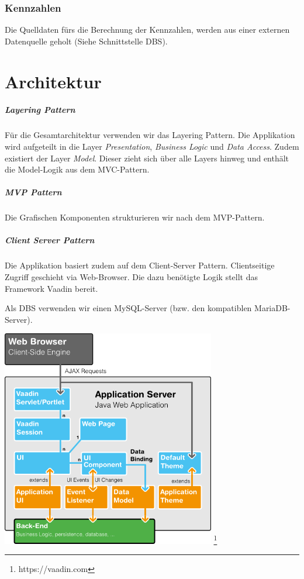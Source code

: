 \documentclass[a4paper]{scrreprt}
\begin{document}
\subsection{Kennzahlen}
Die Quelldaten fürs die Berechnung der Kennzahlen, werden aus einer externen Datenquelle geholt (Siehe Schnittstelle DBS).






\chapter{Architektur}
\paragraph{Layering Pattern}
Für die Gesamtarchitektur verwenden wir das Layering Pattern. Die Applikation wird aufgeteilt in die Layer \textit{Presentation}, \textit{Business Logic} und \textit{Data Access}. Zudem existiert der Layer \textit{Model}. Dieser zieht sich über alle Layers hinweg und enthält die Model-Logik aus dem MVC-Pattern.


\paragraph{MVP Pattern}
Die Grafischen Komponenten strukturieren wir nach dem MVP-Pattern.


\paragraph{Client Server Pattern}
Die Applikation basiert zudem auf dem Client-Server Pattern. Clientseitige Zugriff geschieht via Web-Browser. Die dazu benötigte Logik stellt das Framework Vaadin bereit.

\bigskip
Als DBS verwenden wir einen MySQL-Server (bzw. den kompatiblen MariaDB-Server).


\includegraphics[width=0.7\textwidth]{img/vaadin-arch.png} \footnote{https://vaadin.com}
\end{document}
